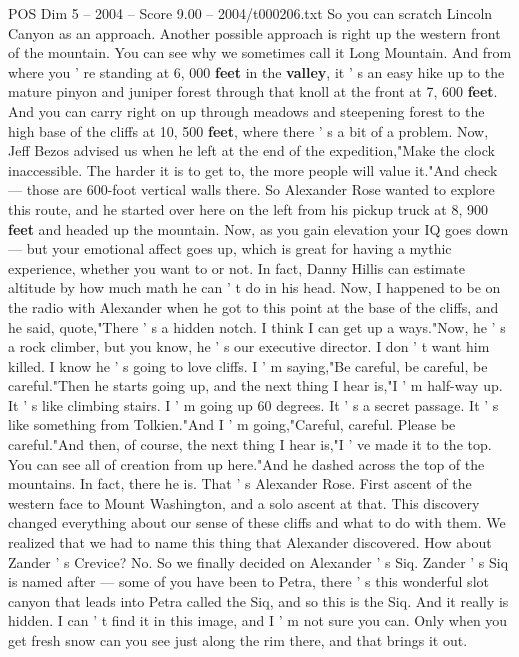 \begin{textsample}{POS Dim 5 – 2004 – Score 9.00 – 2004/t000206.txt}
So you can scratch Lincoln Canyon as an approach.
Another possible approach is right up the western front of the mountain.
You can see why we sometimes call it Long Mountain.
And from where you ' re standing at 6, 000 \textbf{feet} in the \textbf{valley}, it ' s an easy hike up to the mature pinyon and juniper forest through that knoll at the front at 7, 600 \textbf{feet}.
And you can carry right on up through meadows and steepening forest to the high base of the cliffs at 10, 500 \textbf{feet}, where there ' s a bit of a problem.
Now, Jeff Bezos advised us when he left at the end of the expedition,"Make the clock inaccessible.
The harder it is to get to, the more people will value it."And check — those are 600-foot vertical walls there.
So Alexander Rose wanted to explore this route, and he started over here on the left from his pickup truck at 8, 900 \textbf{feet} and headed up the mountain.
Now, as you gain elevation your IQ goes down — but your emotional affect goes up, which is great for having a mythic experience, whether you want to or not.
In fact, Danny Hillis can estimate altitude by how much math he can ' t do in his head.
Now, I happened to be on the radio with Alexander when he got to this point at the base of the cliffs, and he said, quote,"There ' s a hidden notch.
I think I can get up a ways."Now, he ' s a rock climber, but you know, he ' s our executive director.
I don ' t want him killed.
I know he ' s going to love cliffs.
I ' m saying,"Be careful, be careful, be careful."Then he starts going up, and the next thing I hear is,"I ' m half-way up.
It ' s like climbing stairs.
I ' m going up 60 degrees.
It ' s a secret passage.
It ' s like something from Tolkien."And I ' m going,"Careful, careful.
Please be careful."And then, of course, the next thing I hear is,"I ' ve made it to the top.
You can see all of creation from up here."And he dashed across the top of the mountains.
In fact, there he is.
That ' s Alexander Rose.
First ascent of the western face to Mount Washington, and a solo ascent at that.
This discovery changed everything about our sense of these cliffs and what to do with them.
We realized that we had to name this thing that Alexander discovered.
How about Zander ' s Crevice?
No.
So we finally decided on Alexander ' s Siq.
Zander ' s Siq is named after — some of you have been to Petra, there ' s this wonderful slot canyon that leads into Petra called the Siq, and so this is the Siq.
And it really is hidden.
I can ' t find it in this image, and I ' m not sure you can.
Only when you get fresh snow can you see just along the rim there, and that brings it out.

\end{textsample}
